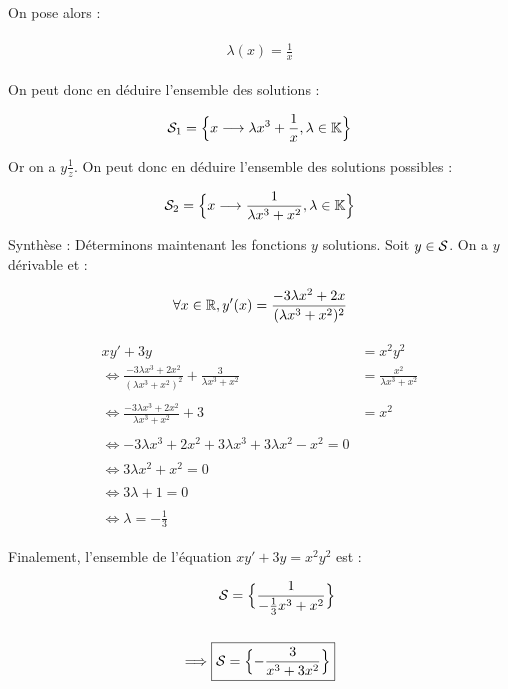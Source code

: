 \documentclass{article}
\begin{document}
On pose alors :

\begin{align*}\begin{split}
\lambda(x)=\frac{1}{x}
\end{split}\end{align*}

On peut donc en déduire l'ensemble des solutions :

\begin{align*}\begin{split}
\mathcal{S}_1=\Bigl\{x\longrightarrow\lambda x^3+\frac{1}{x}, \lambda\in\mathbb{K}\Bigl\}
\end{split}\end{align*}

Or on a $y\frac{1}{z}$. On peut donc en déduire l'ensemble des solutions possibles :

\begin{align*}\begin{split}
\mathcal{S}_2=\Bigl\{x\longrightarrow\frac{1}{\lambda x^3+x^2},\lambda\in\mathbb{K}\Bigl\}
\end{split}\end{align*}

\bigskip
\bigskip
\bigskip

Synthèse : Déterminons maintenant les fonctions $y$ solutions. Soit $y\in\mathcal{S}$. On a $y$ dérivable et :

\begin{align*}\begin{split}
\forall x\in\mathbb{R}, y'(x)=\frac{-3\lambda x^2+2x}{(\lambda x^3+x^2)^2}
\end{split}\end{align*}

\begin{align*}\begin{split}
xy'+3y&=x^2y^2\\
\Longleftrightarrow \frac{-3\lambda x^3 + 2x^2}{(\lambda x^3+x^2)^2}+\frac{3}{\lambda x^3+x^2}&=\frac{x^2}{\lambda x^3+x^2}\\\\
\Longleftrightarrow \frac{-3\lambda x^3 + 2x^2}{\lambda x^3+x^2}+3&=x^2\\\\
\Longleftrightarrow -3\lambda x^3 + 2x^2 +3\lambda x^3 + 3\lambda x^2 - x^2=0\\\\
\Longleftrightarrow 3\lambda x^2+x^2 = 0\\\\
\Longleftrightarrow 3\lambda + 1 = 0\\\\
\Longleftrightarrow \boxed{\lambda = -\frac{1}{3}}
\end{split}\end{align*}

Finalement, l'ensemble de l'équation $xy'+3y=x^2y^2$ est :

\begin{align*}\begin{split}
\mathcal{S}=\Bigl\{\frac{1}{-\frac{1}{3}x^3+x^2}\Bigl\}\\\\
\Longrightarrow \boxed{\mathcal{S}=\Bigl\{-\frac{3}{x^3+3x^2}\Bigl\}}
\end{split}\end{align*}
\end{document}
